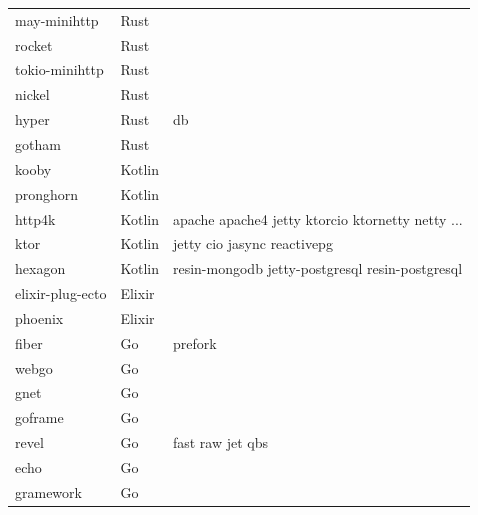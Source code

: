 \begin{longtable}{lll}
    may-minihttp     & Rust        &                                                    \\
    rocket           & Rust        &                                                    \\
    tokio-minihttp   & Rust        &                                                    \\
    nickel           & Rust        &                                                    \\
    hyper            & Rust        & db                                                 \\
    gotham           & Rust        &                                                    \\
    kooby            & Kotlin      &                                                    \\
    pronghorn        & Kotlin      &                                                    \\
    http4k           & Kotlin      & apache apache4 jetty ktorcio ktornetty netty ...   \\
    ktor             & Kotlin      & jetty cio jasync reactivepg                        \\
    hexagon          & Kotlin      & resin-mongodb jetty-postgresql resin-postgresql    \\
    elixir-plug-ecto & Elixir      &                                                    \\
    phoenix          & Elixir      &                                                    \\
    fiber            & Go          & prefork                                            \\
    webgo            & Go          &                                                    \\
    gnet             & Go          &                                                    \\
    goframe          & Go          &                                                    \\
    revel            & Go          & fast raw jet qbs                                   \\
    echo             & Go          &                                                    \\
    gramework        & Go          &                                                    \\

\end{longtable}
